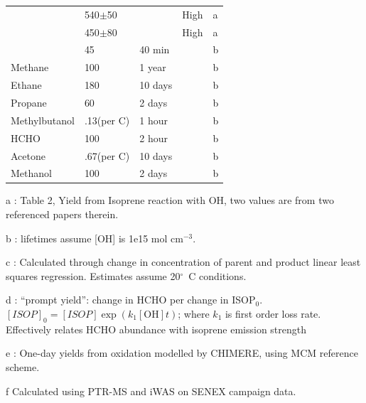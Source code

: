 \begin{table}
\begin{threeparttable}
\begin{tabular}{  l  l  l  l  l  }
          & 540$\pm$50      &        & High          & a     \\ 
          & 450$\pm$80      &        & High          & a      \\ 
          & 45              & 40 min &              & b      \\ %
          Methane 	      & 100             & 1 year  &             & b     \\ 
          Ethane          & 180             & 10 days &             & b     \\ 
          Propane         & 60              & 2 days  &             & b     \\ 
          Methylbutanol   & .13(per C)    & 1 hour  &             & b     \\ 
          HCHO            & 100             & 2 hour  &             & b     \\ 
          Acetone         & .67(per C)      & 10 days &             & b     \\ 
          Methanol        & 100             & 2 days  &             & b     \\ %
          \bottomrule
        \end{tabular}
        \begin{tablenotes} %
          \item a \textcite{AtkinsonArey2003}: Table 2, Yield from Isoprene reaction with OH, two values are from two referenced papers therein.
          \item b \textcite{Palmer2003}: lifetimes assume [OH] is 1e15 mol cm$^{-3}$.
          \item c \parencite{Lee2006}: Calculated through change in concentration of parent and product linear least squares regression.
          Estimates assume 20$^\circ$~C conditions.
          \item d \textcite{Wolfe2016}: ``prompt yield'': change in HCHO per change in ISOP$_0$.
          $[ISOP]_0=[ISOP]\exp(k_1[\mathrm{OH}]t)$; where $k_1$ is first order loss rate.
          Effectively relates HCHO abundance with isoprene emission strength
          \item e \textcite{Dufour2009}: One-day yields from oxidation modelled by CHIMERE, using MCM reference scheme.
          \item f Calculated using PTR-MS and iWAS on SENEX campaign data.
        \end{tablenotes}
        \label{BioIsop:Method:tab_VOCLiteratureYields}
      \end{threeparttable} \end{table}
        
